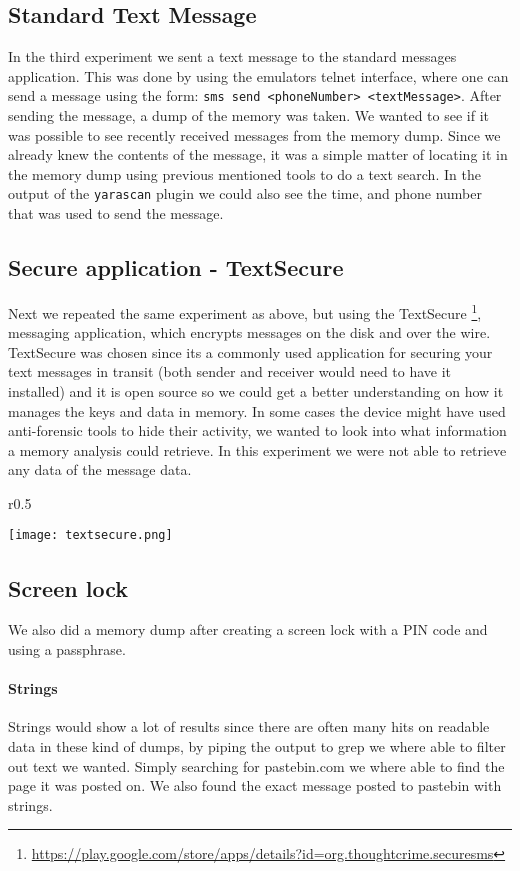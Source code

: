 \subsection{Standard Text Message}
In the third experiment we sent a text message to the standard messages application.
This was done by using the emulators telnet interface, where one can send a message
using the form: \texttt{sms send <phoneNumber> <textMessage>}. After sending the
message, a dump of the memory was taken. We wanted to see if it was possible to 
see recently received messages from the memory dump. Since we already knew the 
contents of the message, it was a simple matter of locating it in the memory 
dump using previous mentioned tools to do a text search. In the output of the
\texttt{yarascan} plugin we could also see the time, and phone number that was
used to send the message.
  
\subsection{Secure application - TextSecure}
Next we repeated the same experiment as above, but using the TextSecure
\footnote{\url{https://play.google.com/store/apps/details?id=org.thoughtcrime.securesms}}, 
messaging application, which encrypts messages on the disk and over the wire.
TextSecure was chosen since its a commonly used application for securing your 
text messages in transit (both sender and receiver would need to have it 
installed) and it is open source so we could get a better understanding on 
how it manages the keys and data in memory.  
In some cases the device might have used anti-forensic tools to hide their 
activity, we wanted to look into what information a memory analysis could 
retrieve. In this experiment we were not able to retrieve any data of the message 
data.
\begin{wrapfigure}{r}{0.5\textwidth}
    \begin{center}
        \texttt{[image: textsecure.png]}
    \end{center}
\end{wrapfigure}

\subsection{Screen lock}
We also did a memory dump after creating a screen lock with a PIN code and using a passphrase.
  \paragraph{Strings}
  Strings would show a lot of results since there are often many hits on readable 
  data in these kind of dumps, by piping the output to grep we where able to 
  filter out text we wanted. Simply searching for pastebin.com we where able to 
  find the page it was posted on. We also found the exact message posted to pastebin with strings.

